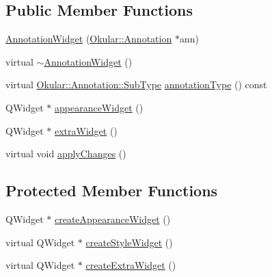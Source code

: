 \subsection*{Public Member Functions}
\begin{DoxyCompactItemize}
\item 
\hyperlink{classAnnotationWidget_a1152e99260c24acde30e2742a07af2ef}{Annotation\+Widget} (\hyperlink{classOkular_1_1Annotation}{Okular\+::\+Annotation} $\ast$ann)
\item 
virtual \hyperlink{classAnnotationWidget_ae86eb3b8adca8b5227e908fab444802f}{$\sim$\+Annotation\+Widget} ()
\item 
virtual \hyperlink{classOkular_1_1Annotation_af71b46e37d5f850b97d5c4de3be9aac0}{Okular\+::\+Annotation\+::\+Sub\+Type} \hyperlink{classAnnotationWidget_a8c837e08592e4cb54829d53e267f5cfc}{annotation\+Type} () const 
\item 
Q\+Widget $\ast$ \hyperlink{classAnnotationWidget_a57411e4d54dde346c8ed57c99da56666}{appearance\+Widget} ()
\item 
Q\+Widget $\ast$ \hyperlink{classAnnotationWidget_a0d1cb7d9a0f518140abecc82aa1e8449}{extra\+Widget} ()
\item 
virtual void \hyperlink{classAnnotationWidget_a00b35958653cb76c93b9d4f70d770f5c}{apply\+Changes} ()
\end{DoxyCompactItemize}
\subsection*{Protected Member Functions}
\begin{DoxyCompactItemize}
\item 
Q\+Widget $\ast$ \hyperlink{classAnnotationWidget_a10702d6e6fd3df11a494c495165b8524}{create\+Appearance\+Widget} ()
\item 
virtual Q\+Widget $\ast$ \hyperlink{classAnnotationWidget_a4b0926d20f0b26deb5b6a4e75f78fac3}{create\+Style\+Widget} ()
\item 
virtual Q\+Widget $\ast$ \hyperlink{classAnnotationWidget_ab46dbe69c6723a640048a75f6bf47423}{create\+Extra\+Widget} ()
\end{DoxyCompactItemize}
